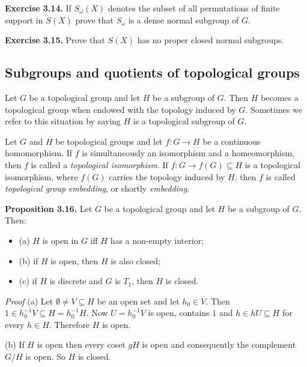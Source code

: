 \documentclass[12pt]{article}
\begin{document}
    \textbf{Exercise 3.14.} If $S_\omega (X)$ denotes the subset of all permutations of finite support in $S(X)$ prove that $S_\omega$ is a
    dense normal subgroup of $G$.


    \textbf{Exercise 3.15.} Prove that $S(X)$ has no proper closed normal subgroups.


    \subsection{Subgroups and quotients of topological groups}


        Let $G$ be a topological group and let $H$ be a subgroup of $G$. Then $H$ becomes a topological group when endowed
    with the topology induced by $G$. Sometimes we refer to this situation by saying $H$ is a topological subgroup of
    $G$.


        Let $G$ and $H$ be topological groups and let $f : G \to H$ be a continuous homomorphism. If $f$ is simultaneously
    an isomorphism and a homeomorphism, then $f$ is called a \emph{topological isomorphism}. If $f : G \to f(G) \subseteq H$ is
    a topological isomorphism, where $f(G)$ carries the topology induced by $H$, then $f$ is called \emph{topological group}
    \emph{embedding}, or shortly \emph{embedding}.


    \textbf{Proposition 3.16.} Let $G$ be a topological group and let $H$ be a subgroup of $G$. Then:


        \begin{itemize}
            \item (a) $H$ is open in $G$ iff $H$ has a non-empty interior;

            \item (b) if $H$ is open, then $H$ is also closed;
            
            \item (c) if $H$ is discrete and $G$ is $T_1$, then $H$ is closed.
        \end{itemize}  


        \emph{Proof} (a) Let $\emptyset \neq V \subseteq H$ be an open set and let $h_0 \in V$. Then $1 \in h^{-1}_0 V \subseteq H = h^{-1}_0 H$. Now $U = h^{-1}_0 V$ is
        open, contains $1$ and $h \in hU \subseteq H$ for every $h \in H$. Therefore $H$ is open.


        (b) If $H$ is open then every coset $gH$ is open and consequently the complement $G / H$ is open. So $H$ is
            closed.
\end{document}
